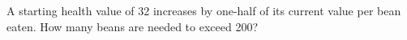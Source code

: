 A starting health value of 32 increases by one-half of its current value per bean eaten. How many beans are needed to exceed 200?
